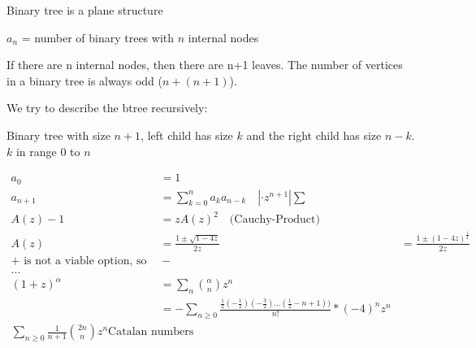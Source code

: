 
Binary tree is a plane structure

$a_n$ = number of binary trees with $n$ internal nodes

If there are n internal nodes, then there are n+1 leaves. The number of vertices in a binary tree is always odd ($n + (n+1)$). 

We try to describe the btree recursively:

Binary tree with size $n+1$,
left child has size $k$ and the right child has size $n-k$. 
$k$ in range $0$ to $n$

\begin{align*}
    a_0 &= 1 \\
    a_{n+1} &= \sum_{k=0}^{n} a_k a_{n-k}
        \quad | \cdot z^{n+1} | \sum \\
    A(z) - 1 &= z A(z)^2
        \quad \text{(Cauchy-Product)} \\
    A(z) &= \frac{1 \pm \sqrt{1-4z}}{2z}
        &= \frac{1 \pm (1-4z)^\frac1{2}}{2z} \\
    \text{$+$ is not a viable option, so we use the $-$} \\
    ... \\
    (1 + z)^\alpha &= \sum_n {\alpha \choose n} z^n \\
    &= - \sum_{n\geq 0} \frac{\frac12 (-\frac12) (-\frac32) \ldots (\frac12 - n+1))}{n!} * (-4)^n z^n \\
    \sum_{n\geq 0} \frac{1}{n+1} {2n \choose n} z^n
    \text{Catalan numbers}
\end{align*}












